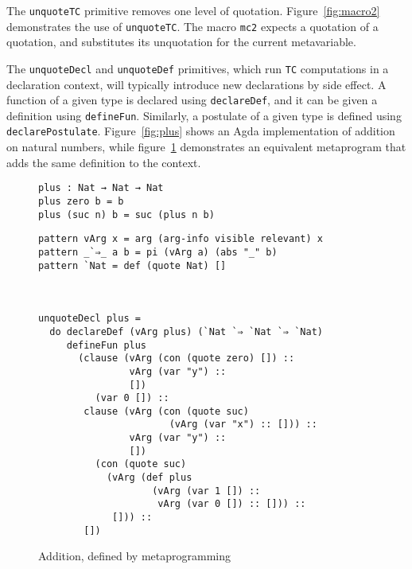 \documentclass[runningheads]{llncs}
\begin{document}
%

The {\tt unquoteTC} primitive removes one level of quotation.
Figure~\ref{fig:macro2} demonstrates the use of \texttt{unquoteTC}.
The macro {\tt mc2} expects a quotation of a quotation, and substitutes its unquotation for the current metavariable.

The {\tt unquoteDecl} and {\tt unquoteDef} primitives, which run \texttt{TC} computations in a declaration context, will typically introduce new declarations by side effect.
A function of a given type is declared using {\tt declareDef}, and it can be given a definition using {\tt defineFun}.
Similarly, a postulate of a given type is defined using {\tt declarePostulate}.
Figure~\ref{fig:plus} shows an Agda implementation of addition on natural numbers, while figure~\ref{fig:plusmeta} demonstrates an equivalent metaprogram that adds the same definition to the context.

\begin{figure}[t]
\centering
\begin{minipage}{.5\textwidth}
\centering
\begingroup
\fontsize{7.9pt}{2pt}\selectfont
\begin{Verbatim}
plus : Nat → Nat → Nat
plus zero b = b
plus (suc n) b = suc (plus n b)
\end{Verbatim}
\endgroup
{}
\label{fig:plus}
\end{minipage}%
\begin{minipage}{.5\textwidth}
\centering
\begingroup
\fontsize{7.9pt}{2pt}\selectfont
\begin{Verbatim}
pattern vArg x = arg (arg-info visible relevant) x
pattern _`⇒_ a b = pi (vArg a) (abs "_" b)
pattern `Nat = def (quote Nat) []



unquoteDecl plus =
  do declareDef (vArg plus) (`Nat `⇒ `Nat `⇒ `Nat)
     defineFun plus
       (clause (vArg (con (quote zero) []) ::
                vArg (var "y") ::
                [])
          (var 0 []) ::
        clause (vArg (con (quote suc)
                       (vArg (var "x") :: [])) ::
                vArg (var "y") ::
                [])
          (con (quote suc)
            (vArg (def plus
                    (vArg (var 1 []) ::
                     vArg (var 0 []) :: [])) ::
             [])) ::
        [])
\end{Verbatim}
\endgroup
\caption{Addition, defined by metaprogramming}
\label{fig:plusmeta}
\end{minipage}
\end{figure}
\end{document}
